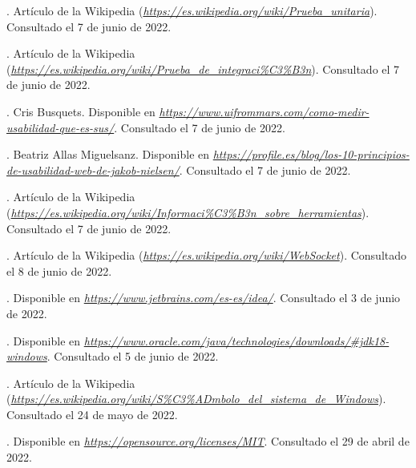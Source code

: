 \begin{thebibliography}{99}
. Artículo de la Wikipedia ({\it \url{https://es.wikipedia.org/wiki/Prueba_unitaria}}). Consultado el 7 de junio de 2022.

. Artículo de la Wikipedia ({\it \url{https://es.wikipedia.org/wiki/Prueba_de_integraci%C3%B3n}}). Consultado el 7 de junio de 2022.

. Cris Busquets. Disponible en {\it \url{https://www.uifrommars.com/como-medir-usabilidad-que-es-sus/}}. Consultado el 7 de junio de 2022.

. Beatriz Allas Miguelsanz. Disponible en {\it \url{https://profile.es/blog/los-10-principios-de-usabilidad-web-de-jakob-nielsen/}}. Consultado el 7 de junio de 2022.

. Artículo de la Wikipedia ({\it \url{https://es.wikipedia.org/wiki/Informaci%C3%B3n_sobre_herramientas}}). Consultado el 7 de junio de 2022.

. Artículo de la Wikipedia ({\it \url{https://es.wikipedia.org/wiki/WebSocket}}). Consultado el 8 de junio de 2022.

. Disponible en {\it \url{https://www.jetbrains.com/es-es/idea/}}. Consultado el 3 de junio de 2022.

. Disponible en {\it \url{https://www.oracle.com/java/technologies/downloads/#jdk18-windows}}. Consultado el 5 de junio de 2022.

. Artículo de la Wikipedia ({\it \url{https://es.wikipedia.org/wiki/S%C3%ADmbolo_del_sistema_de_Windows}}). Consultado el 24 de mayo de 2022.

. Disponible en {\it \url{https://opensource.org/licenses/MIT}}. Consultado el 29 de abril de 2022.
\end{thebibliography}